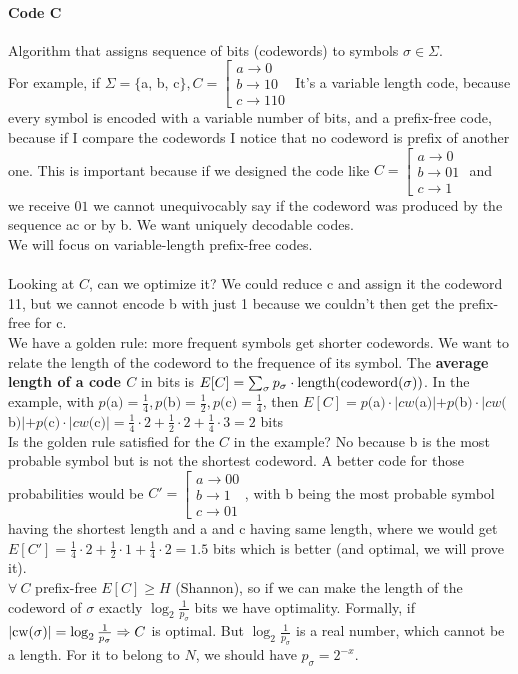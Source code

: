 \documentclass[10pt]{report}
\begin{document}
\paragraph{Code C} Algorithm that assigns sequence of bits (codewords) to symbols $\sigma\in\Sigma$.\\
For example, if $\Sigma = \{$a, b, c$\}, C = \left[\begin{array}{l}
a\rightarrow 0\\
b\rightarrow 10\\
c\rightarrow 110
\end{array}\right.$ It's a variable length code, because every symbol is encoded with a variable number of bits, and a prefix-free code, because if I compare the codewords I notice that no codeword is prefix of another one. This is important because if we designed the code like $C = \left[\begin{array}{l}
a\rightarrow 0\\
b\rightarrow 01\\
c\rightarrow 1
\end{array}\right.$ and we receive $01$ we cannot unequivocably say if the codeword was produced by the sequence ac or by b. We want uniquely decodable codes.\\
We will focus on variable-length prefix-free codes.\\\\
Looking at $C$, can we optimize it? We could reduce c and assign it the codeword 11, but we cannot encode b with just 1  because we couldn't then get the prefix-free for c.\\
We have a golden rule: more frequent symbols get shorter codewords. We want to relate the length of the codeword to the frequence of its symbol. The \textbf{average length of a code $C$} in bits is $E[C] = \sum_\sigma p_\sigma\cdot\hbox{length}(\hbox{codeword}(\sigma))$. In the example, with $p($a$) = \frac{1}{4}, p($b$) = \frac{1}{2}, p($c$) = \frac{1}{4}$, then $E[C] = p($a$)\cdot|cw($a$)| + p($b$)\cdot|cw($b$)| + p($c$)\cdot|cw($c$)| = \frac{1}{4}\cdot 2 + \frac{1}{2}\cdot 2 + \frac{1}{4}\cdot 3 = 2$ bits\\
Is the golden rule satisfied for the $C$ in the example? No because b is the most probable symbol but is not the shortest codeword. A better code for those probabilities would be $C' = \left[\begin{array}{l}
a\rightarrow 00\\
b\rightarrow 1\\
c\rightarrow 01
\end{array}\right.$, with b being the most probable symbol having the shortest length and a and c having same length, where we would get $E[C'] = \frac{1}{4}\cdot2 + \frac{1}{2}\cdot1 + \frac{1}{4}\cdot2 = 1.5$ bits which is better (and optimal, we will prove it).\\
$\forall\:C$ prefix-free $E[C] \geq H$ (Shannon), so if we can make the length of the codeword of $\sigma$ exactly $\log_2 \frac{1}{p_\sigma}$ bits we have optimality. Formally, if $|\hbox{cw}(\sigma)| = \log_2\frac{1}{p_\sigma} \Rightarrow C$ is optimal. But $\log_2\frac{1}{p_\sigma}$ is a real number, which cannot be a length. For it to belong to $N$, we should have $p_\sigma = 2^{-x}$.
\end{document}
